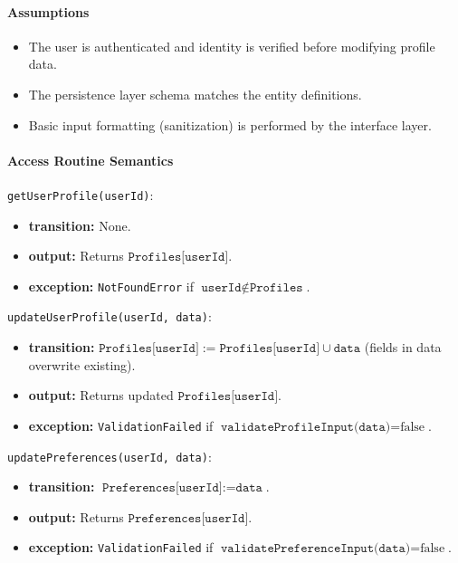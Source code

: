 \paragraph{Assumptions}
\begin{itemize}
    \item The user is authenticated and identity is verified before modifying profile data.
    \item The persistence layer schema matches the entity definitions.
    \item Basic input formatting (sanitization) is performed by the interface layer.
\end{itemize}

\paragraph{Access Routine Semantics}

\noindent \texttt{getUserProfile(userId)}:
\begin{itemize}
    \item \textbf{transition:} None.
    \item \textbf{output:} Returns $\texttt{Profiles[userId]}$.
    \item \textbf{exception:} \texttt{NotFoundError} if $\texttt{userId} \notin \texttt{Profiles}$.
\end{itemize}

\noindent \texttt{updateUserProfile(userId, data)}:
\begin{itemize}
    \item \textbf{transition:} $\texttt{Profiles[userId]} := \texttt{Profiles[userId]} \cup \texttt{data}$ (fields in data overwrite existing).
    \item \textbf{output:} Returns updated $\texttt{Profiles[userId]}$.
    \item \textbf{exception:} \texttt{ValidationFailed} if $\texttt{validateProfileInput(data)} = \text{false}$.
\end{itemize}

\noindent \texttt{updatePreferences(userId, data)}:
\begin{itemize}
    \item \textbf{transition:} $\texttt{Preferences[userId]} := \texttt{data}$.
    \item \textbf{output:} Returns $\texttt{Preferences[userId]}$.
    \item \textbf{exception:} \texttt{ValidationFailed} if $\texttt{validatePreferenceInput(data)} = \text{false}$.
\end{itemize}

